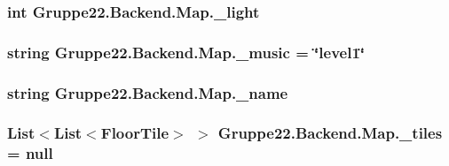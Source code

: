 \hypertarget{class_gruppe22_1_1_backend_1_1_map_ad75386d3edea7cb43bbf558742a5824e}{
\subsubsection[{\-\_\-light}]{\setlength{\rightskip}{0pt plus 5cm}int Gruppe22.\-Backend.\-Map.\-\_\-light\hspace{0.3cm}{\ttfamily [protected]}}}\label{class_gruppe22_1_1_backend_1_1_map_ad75386d3edea7cb43bbf558742a5824e}
\hypertarget{class_gruppe22_1_1_backend_1_1_map_a99cac5327d78e72ced96f0dad20060cf}{
\subsubsection[{\-\_\-music}]{\setlength{\rightskip}{0pt plus 5cm}string Gruppe22.\-Backend.\-Map.\-\_\-music = \char`\"{}level1\char`\"{}\hspace{0.3cm}{\ttfamily [protected]}}}\label{class_gruppe22_1_1_backend_1_1_map_a99cac5327d78e72ced96f0dad20060cf}
\hypertarget{class_gruppe22_1_1_backend_1_1_map_a4848f9eaed6a4fb65f88bd3b72e2d8f0}{
\subsubsection[{\-\_\-name}]{\setlength{\rightskip}{0pt plus 5cm}string Gruppe22.\-Backend.\-Map.\-\_\-name\hspace{0.3cm}{\ttfamily [protected]}}}\label{class_gruppe22_1_1_backend_1_1_map_a4848f9eaed6a4fb65f88bd3b72e2d8f0}
\hypertarget{class_gruppe22_1_1_backend_1_1_map_a50c1a30d7d1c705375416767a474aa36}{
\subsubsection[{\-\_\-tiles}]{\setlength{\rightskip}{0pt plus 5cm}List$<$List$<${\bf Floor\-Tile}$>$ $>$ Gruppe22.\-Backend.\-Map.\-\_\-tiles = null\hspace{0.3cm}{\ttfamily [protected]}}}\label{class_gruppe22_1_1_backend_1_1_map_a50c1a30d7d1c705375416767a474aa36}


